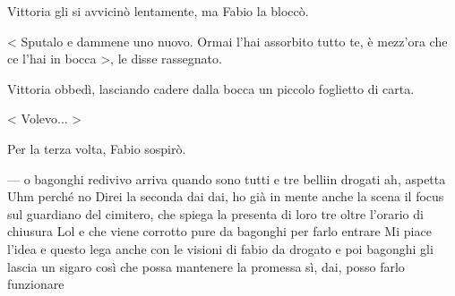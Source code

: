 Vittoria gli si avvicinò lentamente, ma Fabio la bloccò.

< Sputalo e dammene uno nuovo. Ormai l'hai assorbito tutto te, è mezz'ora che ce l'hai in bocca >, le disse rassegnato.

Vittoria obbedì, lasciando cadere dalla bocca un piccolo foglietto di carta.

< Volevo... >

Per la terza volta, Fabio sospirò.

---
o bagonghi redivivo arriva quando sono tutti e tre belliin drogati
ah, aspetta
Uhm
perché no
Direi la seconda
dai dai, ho già in mente anche la scena
il focus sul guardiano del cimitero, che spiega la presenta di loro tre oltre l'orario di chiusura
Lol
e che viene corrotto pure da bagonghi per farlo entrare
Mi piace l'idea
e questo lega anche con le visioni di fabio da drogato
e poi bagonghi gli lascia un sigaro
così che possa mantenere la promessa
sì, dai, posso farlo funzionare
